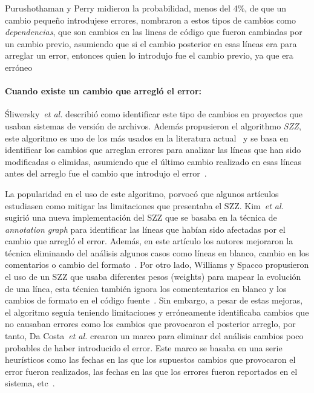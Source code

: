 \documentclass[a4paper, 12pt]{book}
\begin{document}
Purushothaman y Perry midieron la probabilidad, menos del 4\%, de que un cambio peque\~no introdujese errores, nombraron a estos tipos de cambios como \emph{dependencias}, que son cambios en las lineas de c\'odigo que fueron cambiadas por un cambio previo, asumiendo que si el cambio posterior en esas l\'ineas era para arreglar un error, entonces quien lo introdujo fue el cambio previo, ya que era err\'oneo~\cite{purushothaman2004towards}

\paragraph{Cuando existe un cambio que arregl\'o el error:}
\'Sliwersky~\emph{et al.} describi\'o como identificar este tipo de cambios en proyectos que usaban sistemas de versi\'on de archivos. Adem\'as propusieron el algorithmo \emph{SZZ}, este algoritmo es uno de los m\'as usados en la literatura actual~ y se basa en identificar los cambios que arreglan errores para analizar las l\'ineas que han sido modificadas o elimidas, asumiendo que el \'ultimo cambio realizado en esas l\'ineas antes del arreglo fue el cambio que introdujo el error~\cite{sliwerski2005changes}.

La popularidad en el uso de este algoritmo, porvoc\'o que algunos art\'iculos estudiasen como mitigar las limitaciones que presentaba el SZZ. Kim~\textit{et al.} sugiri\'o una nueva implementaci\'on del SZZ que se basaba en la t\'ecnica de \textit{annotation graph} para identificar las l\'ineas que hab\'ian sido afectadas por el cambio que arregl\'o el error. Adem\'as, en este art\'iculo los autores mejoraron la t\'ecnica eliminando del an\'alisis algunos casos como l\'ineas en blanco, cambio en los comentarios o cambio del formato~\cite{kim2006automatic}. Por otro lado, Williams y Spacco propusieron el uso de un SZZ que usaba diferentes pesos (weights) para mapear la evoluci\'on de una l\'inea, esta t\'ecnica tambi\'en ignora los comententarios en blanco y los cambios de formato en el c\'odigo fuente~\cite{williams2008szz}. Sin embargo, a pesar de estas mejoras, el algoritmo segu\'ia teniendo limitaciones y err\'oneamente identificaba cambios que no causaban errores como los cambios que provocaron el posterior arreglo, por tanto,  Da Costa~\textit{et al.} crearon un marco para eliminar del an\'alisis cambios poco probables de haber introducido el error. Este marco se basaba en una serie heur\'isticos como las fechas en las que los supuestos cambios que provocaron el error fueron realizados, las fechas en las que los errores fueron reportados en el sistema, etc~\cite{da2016framework}.
\end{document}
